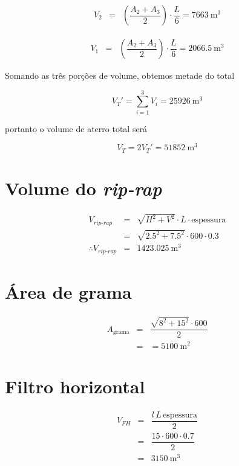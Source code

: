 \documentclass[a4paper, 12pt, brazilian]{article}
\begin{document}
	\begin{eqnarray}
		V_{2}&=&\left(\dfrac{A_{2}+A_{3}}{2}\right)\cdot\dfrac{L}{6}=\SI{7663}{\meter^{3}}	
	\end{eqnarray}
	
	\begin{eqnarray}
		V_{1}&=&\left(\dfrac{A_{2}+A_{3}}{2}\right)\cdot\dfrac{L}{6}=\SI{2066.5}{\meter^{3}}
	\end{eqnarray}
	
	Somando as três porções de volume, obtemos metade do total
	
	\begin{equation}
		V_{T}'=\sum\limits_{i=1}^{3}V_{i}=\SI{25926}{\meter^{3}}
	\end{equation}
	
	portanto o volume de aterro total será 
	
	\begin{equation}
		V_{T}=2V_{T}'=\SI{51852}{\meter^{3}}
	\end{equation}
	
	\section{Volume do \textit{rip-rap}}
	
	\begin{eqnarray}
		V_{\textit{rip-rap}}&=&\sqrt{H^{2}+V^{2}}\cdot L\cdot\textrm{espessura}\\
		&=&\sqrt{2.5^{2}+7.5^{2}}\cdot 600\cdot 0.3\\
		\therefore V_{\textit{rip-rap}}&=&\SI{1423.025}{\meter^{3}}
	\end{eqnarray}
	
	\section{Área de grama}
	
	\begin{eqnarray}
		A_{\textrm{grama}}&=&\dfrac{\sqrt{8^{2}+15^{2}}\cdot 600}{2}\\
		&=&=\SI{5100}{\meter^{2}}
	\end{eqnarray}
	
	\section{Filtro horizontal}
	
	\begin{eqnarray}
		V_{FH}&=&\dfrac{l\,L\,\textrm{espessura}}{2}\\
		&=&\dfrac{15\cdot 600\cdot 0.7}{2}\\
		&=&\SI{3150}{\meter^{3}}
	\end{eqnarray}
	
\end{document}
